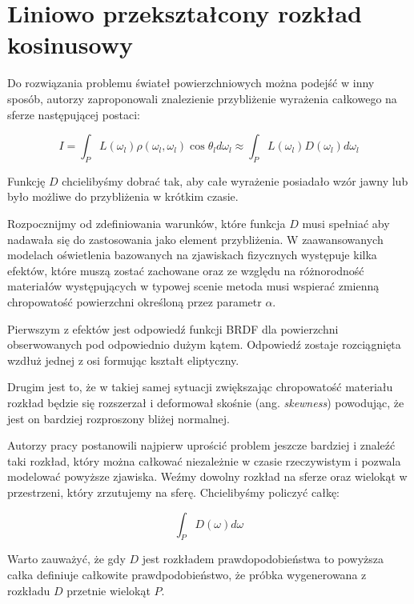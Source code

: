 \documentclass[../main.tex]{subfiles}
\begin{document}
\chapter{Liniowo przekształcony rozkład kosinusowy}

Do rozwiązania problemu świateł powierzchniowych można podejść w inny sposób,
autorzy \cite{ltc_heitz} zaproponowali znalezienie przybliżenie wyrażenia
całkowego na sferze następującej postaci:

\begin{displaymath}
I = \int_{P} {
  L(\omega_l)
  \rho(\omega_l, \omega_l)
  \cos \theta_l
  d \omega_l
}
\approx
\int_{P} {
  L(\omega_l)
  D(\omega_l)
  d \omega_l
}
\end{displaymath}

Funkcję $D$ chcielibyśmy dobrać tak, aby całe wyrażenie posiadało wzór jawny
lub było możliwe do przybliżenia w krótkim czasie.

Rozpocznijmy od zdefiniowania warunków, które funkcja $D$ musi spełniać aby
nadawała się do zastosowania jako element przybliżenia. W zaawansowanych
modelach oświetlenia bazowanych na zjawiskach fizycznych występuje kilka
efektów, które muszą zostać zachowane oraz ze względu na różnorodność
materiałów występujących w typowej scenie metoda musi wspierać zmienną
chropowatość powierzchni określoną przez parametr $\alpha$.

Pierwszym z efektów jest odpowiedź funkcji BRDF dla powierzchni obserwowanych
pod odpowiednio dużym kątem. Odpowiedź zostaje rozciągnięta wzdłuż jednej z
osi formując kształt eliptyczny.

Drugim jest to, że w takiej samej sytuacji zwiększając chropowatość materiału
rozkład będzie się rozszerzał i deformował skośnie (ang. \textit{skewness})
powodując, że jest on bardziej rozproszony bliżej normalnej.

Autorzy pracy \cite{ltc_heitz} postanowili najpierw uprościć problem jeszcze
bardziej i znaleźć taki rozkład, który można całkować niezależnie w czasie
rzeczywistym i pozwala modelować powyższe zjawiska. Weźmy dowolny rozkład na
sferze oraz wielokąt  w przestrzeni, który zrzutujemy na sferę. Chcielibyśmy
policzyć całkę:

\begin{displaymath}
\int_P {
  D(\omega)
  d \omega
}
\end{displaymath}

Warto zauważyć, że gdy $D$ jest rozkładem prawdopodobieństwa to powyższa całka
definiuje całkowite prawdpodobieństwo, że próbka wygenerowana z rozkładu $D$
przetnie wielokąt $P$.
\end{document}
